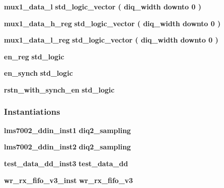 \begin{DoxyCompactItemize}
\item 
{\bf mux1\+\_\+data\+\_\+l} {\bfseries \textcolor{comment}{std\+\_\+logic\+\_\+vector}\textcolor{vhdlchar}{ }\textcolor{vhdlchar}{(}\textcolor{vhdlchar}{ }\textcolor{vhdlchar}{ }\textcolor{vhdlchar}{ }\textcolor{vhdlchar}{ }{\bfseries {\bf diq\+\_\+width}} \textcolor{vhdlchar}{ }\textcolor{keywordflow}{downto}\textcolor{vhdlchar}{ }\textcolor{vhdlchar}{ } \textcolor{vhdldigit}{0} \textcolor{vhdlchar}{ }\textcolor{vhdlchar}{)}\textcolor{vhdlchar}{ }} 
\item 
{\bf mux1\+\_\+data\+\_\+h\+\_\+reg} {\bfseries \textcolor{comment}{std\+\_\+logic\+\_\+vector}\textcolor{vhdlchar}{ }\textcolor{vhdlchar}{(}\textcolor{vhdlchar}{ }\textcolor{vhdlchar}{ }\textcolor{vhdlchar}{ }\textcolor{vhdlchar}{ }{\bfseries {\bf diq\+\_\+width}} \textcolor{vhdlchar}{ }\textcolor{keywordflow}{downto}\textcolor{vhdlchar}{ }\textcolor{vhdlchar}{ } \textcolor{vhdldigit}{0} \textcolor{vhdlchar}{ }\textcolor{vhdlchar}{)}\textcolor{vhdlchar}{ }} 
\item 
{\bf mux1\+\_\+data\+\_\+l\+\_\+reg} {\bfseries \textcolor{comment}{std\+\_\+logic\+\_\+vector}\textcolor{vhdlchar}{ }\textcolor{vhdlchar}{(}\textcolor{vhdlchar}{ }\textcolor{vhdlchar}{ }\textcolor{vhdlchar}{ }\textcolor{vhdlchar}{ }{\bfseries {\bf diq\+\_\+width}} \textcolor{vhdlchar}{ }\textcolor{keywordflow}{downto}\textcolor{vhdlchar}{ }\textcolor{vhdlchar}{ } \textcolor{vhdldigit}{0} \textcolor{vhdlchar}{ }\textcolor{vhdlchar}{)}\textcolor{vhdlchar}{ }} 
\item 
{\bf en\+\_\+reg} {\bfseries \textcolor{comment}{std\+\_\+logic}\textcolor{vhdlchar}{ }} 
\item 
{\bf en\+\_\+synch} {\bfseries \textcolor{comment}{std\+\_\+logic}\textcolor{vhdlchar}{ }} 
\item 
{\bf rstn\+\_\+with\+\_\+synch\+\_\+en} {\bfseries \textcolor{comment}{std\+\_\+logic}\textcolor{vhdlchar}{ }} 
\end{DoxyCompactItemize}
\subsubsection*{Instantiations}
 \begin{DoxyCompactItemize}
\item 
{\bf lms7002\+\_\+ddin\+\_\+inst1}  {\bfseries diq2\+\_\+sampling}   
\item 
{\bf lms7002\+\_\+ddin\+\_\+inst2}  {\bfseries diq2\+\_\+sampling}   
\item 
{\bf test\+\_\+data\+\_\+dd\+\_\+inst3}  {\bfseries test\+\_\+data\+\_\+dd}   
\item 
{\bf wr\+\_\+rx\+\_\+fifo\+\_\+v3\+\_\+inst}  {\bfseries wr\+\_\+rx\+\_\+fifo\+\_\+v3}   
\end{DoxyCompactItemize}


